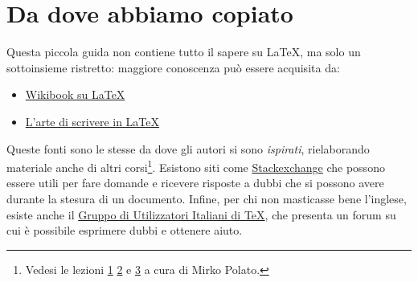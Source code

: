 \section{Da dove abbiamo copiato}

Questa piccola guida non contiene tutto il sapere su \LaTeX{}, ma solo un 
sottoinsieme ristretto: maggiore conoscenza può essere acquisita da:
\begin{itemize}
 \item \href{https://en.wikibooks.org/wiki/LaTeX/}{Wikibook su LaTeX}
 \item \href{http://www.lorenzopantieri.net/LaTeX_files/ArteLaTeX.pdf}{L'arte 
di scrivere in LaTeX}
\end{itemize}

\noindent
Queste fonti sono le stesse da dove gli autori si sono \textit{ispirati}, 
rielaborando materiale anche di altri corsi\footnote{Vedesi le lezioni
\href{http://www.math.unipd.it/~mpolato/didattica/latex/lesson_1.pdf}{1} 
\href{http://www.math.unipd.it/~mpolato/didattica/latex/lesson_2.pdf}{2} e 
\href{http://www.math.unipd.it/~mpolato/didattica/latex/lesson_3.pdf}{3} a 
cura di Mirko Polato.}.
Esistono siti come \href{https://tex.stackexchange.com/}{Stackexchange} che 
possono essere utili per fare domande e ricevere risposte a dubbi che si possono 
avere durante la stesura di un documento. Infine, per chi non masticasse bene 
l'inglese, esiste anche il \href{http://www.guitex.org/}{Gruppo di Utilizzatori 
Italiani di TeX}, che presenta un forum su cui è possibile esprimere dubbi e 
ottenere aiuto.